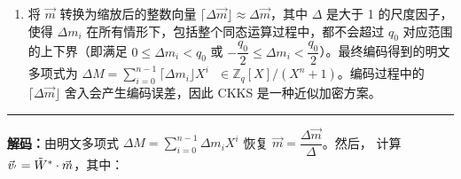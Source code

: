 \begin{tcolorbox}[title={\textbf{\tboxlabel{\ref*{subsec:ckks-encoding-decoding}} CKKS 的编码与解码}}]
\begin{enumerate}
\small{\noindent $ = \begin{bmatrix}
1 & 1 & \cdots & 1 & 1 & 1 & \cdots & 1\\
(\omega^{J(\frac{n}{2} - 1)}) & (\omega^{J(\frac{n}{2} - 2)}) & \cdots & (\omega^{J(0)}) & (\overline\omega^{J(\frac{n}{2} - 1)}) & (\overline\omega^{J(\frac{n}{2} - 2)}) & \cdots & (\overline\omega^{J(0)})\\
(\omega^{J(\frac{n}{2} - 1)})^2 & (\omega^{J(\frac{n}{2} - 2)})^2 & \cdots & (\omega^{J(0)})^2 & (\overline\omega^{J(\frac{n}{2} - 1)})^2 & (\overline\omega^{J(\frac{n}{2} - 2)})^2 & \cdots & (\overline\omega^{J(0)})^2 \\
\vdots & \vdots & \ddots & \vdots & \vdots & \ddots & \vdots & \vdots \\
(\omega^{J(\frac{n}{2} - 1)})^{n-1} & (\omega^{J(\frac{n}{2} - 2)})^{n-1} & \cdots & (\omega^{J(0)})^{n-1} & (\overline\omega^{J(\frac{n}{2} - 1)})^{n-1} & (\overline\omega^{J(\frac{n}{2} - 2)})^{n-1} & \vdots  & (\overline\omega^{J(0)})^{n-1}
\end{bmatrix}$}

\textcolor{red}{ $\rhd$ 因为 $\omega^{-1} = e^{\frac{-i\pi}{n}} = \overline{e^{\frac{i\pi}{n}}} = \overline\omega$}

$ $

\item 将 $\vec{m}$ 转换为缩放后的整数向量 $\lceil \Delta\vec{m} \rfloor \approx \Delta \vec{m}$，其中 $\Delta$ 是大于 1 的尺度因子，使得 $\Delta m_i$ 在所有情形下，包括整个同态运算过程中，都不会超过 $q_0$ 对应范围的上下界（即满足 $0 \leq \Delta m_i < q_0$ 或 $-\dfrac{q_0}{2} \leq \Delta m_i < \dfrac{q_0}{2}$）。最终编码得到的明文多项式为 $\Delta M = \sum\limits_{i=0}^{n-1} \lceil \Delta m_i \rfloor X^i \text{ } \in \mathbb{Z}_q[X] / (X^n + 1)$。编码过程中的 $\lceil \Delta \vec{m} \rfloor$ 舍入会产生编码误差，因此 CKKS 是一种近似加密方案。

\end{enumerate}

\par\noindent\rule{\textwidth}{0.4pt}

\textbf{\underline{解码}：}由明文多项式 $\Delta M = \sum\limits_{i=0}^{n-1}\Delta m_iX^i$ 恢复 $\vec{m} = \dfrac{\Delta \vec{m}}{\Delta}$。然后，
计算 $\vec{v}_{'} = \tilde W^* \cdot \vec{m}$，其中：


\end{tcolorbox}

